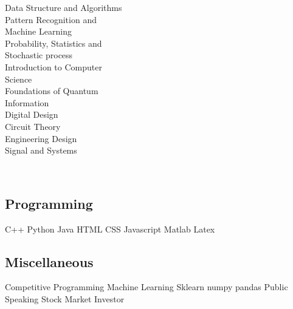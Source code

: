 \documentclass[a4paper]{MagicalCV}
\begin{document}
\begin{minipage}[t]{0.33\textwidth}
 \textbullet{} Data Structure and Algorithms \\
 \textbullet{} Pattern Recognition and \\ \hspace{0.14cm} Machine Learning \\
 \textbullet{} Probability, Statistics and\\ \hspace{0.14cm} Stochastic process \\
 \textbullet{} Introduction to Computer\\ \hspace{0.14cm} Science \\
  \textbullet{} Foundations of Quantum\\ \hspace{0.14cm} Information \\ 
  \textbullet{} Digital Design \\
  \textbullet{} Circuit Theory \\
  \textbullet{} Engineering Design \\
  \textbullet{} Signal and Systems
\sectionsep

\\
\bigskip
\subsection{Programming}
 \textbullet{}   C++ \textbullet{} Python
 \newline
 \textbullet{} Java \textbullet{} HTML \textbullet{}
CSS \newline \textbullet{} Javascript \textbullet{} Matlab \textbullet{} Latex
\sectionsep
\subsection{Miscellaneous}
 \textbullet{} Competitive Programming \newline \textbullet{} Machine Learning \newline \textbullet{} Sklearn \textbullet{} numpy \textbullet{} pandas\newline \textbullet{} Public Speaking
 \newline
 \textbullet{} Stock Market Investor
\sectionsep


\end{minipage}
\end{document}
